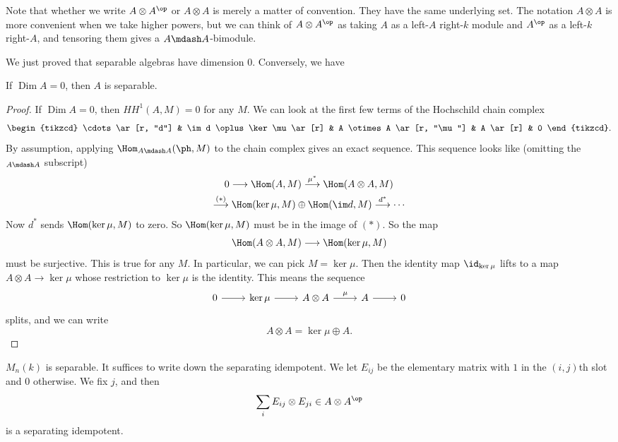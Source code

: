 \documentclass[a4paper]{article}
\DeclareMathOperator\Dim{Dim}
\newcommand\HH{H\!H}
\begin{document}
Note that whether we write $A \otimes A^\op$ or $A \otimes A$ is merely a matter of convention. They have the same underlying set. The notation $A \otimes A$ is more convenient when we take higher powers, but we can think of $A \otimes A^\op$ as taking $A$ as a left-$A$ right-$k$ module and $A^\op$ as a left-$k$ right-$A$, and tensoring them gives a $A\mdash A$-bimodule.

We just proved that separable algebras have dimension $0$. Conversely, we have
\begin{lemma}
  If $\Dim A = 0$, then $A$ is separable.
\end{lemma}

\begin{proof}
  If $\Dim A = 0$, then $\HH^1(A, M) = 0$ for any $M$. We can look at the first few terms of the Hochschild chain complex
  \[
    \begin{tikzcd}
      \cdots \ar[r, "d"] & \im d \oplus \ker \mu \ar[r] & A \otimes A \ar[r, "\mu"] & A \ar[r] & 0
    \end{tikzcd}.
  \]
  By assumption, applying $\Hom_{A\mdash A} (\ph, M)$ to the chain complex gives an exact sequence. This sequence looks like (omitting the $_{A\mdash A}$ subscript)
  \begin{multline*}
    0 \longrightarrow \Hom(A, M) \overset{\mu^*}{\longrightarrow} \Hom(A \otimes A, M)\\
    \overset{(*)}{\longrightarrow} \Hom(\ker \mu, M) \oplus \Hom(\im d, M) \overset{d^*}{\longrightarrow} \cdots
  \end{multline*}
  Now $d^*$ sends $\Hom(\ker \mu, M)$ to zero. So $\Hom(\ker \mu, M)$ must be in the image of $(*)$. So the map
  \[
    \Hom(A \otimes A, M) \longrightarrow \Hom(\ker \mu, M)
  \]
  must be surjective. This is true for any $M$. In particular, we can pick $M = \ker \mu$. Then the identity map $\id_{\ker \mu}$ lifts to a map $A \otimes A \to \ker \mu$ whose restriction to $\ker \mu$ is the identity. This means the sequence
  \[
    \begin{tikzcd}
      0 \ar[r] & \ker \mu \ar[r] & A \otimes A \ar[r, "\mu"] & A \ar[r] & 0
    \end{tikzcd}
  \]
  splits, and we can write
  \[
    A \otimes A = \ker \mu \oplus A.
  \]
\end{proof}

\begin{eg}
  $M_n(k)$ is separable. It suffices to write down the separating idempotent. We let $E_{ij}$ be the elementary matrix with $1$ in the $(i,j)$th slot and $0$ otherwise. We fix $j$, and then
  \[
    \sum_i E_{ij} \otimes E_{ji} \in A\otimes A^\op
  \]
  is a separating idempotent.
\end{eg}
\end{document}
